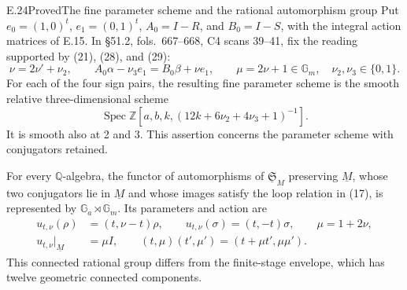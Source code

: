 \begin{statement}{E.24}{Proved}{The fine parameter scheme and the rational automorphism group}
Put \(e_0=(1,0)^t\), \(e_1=(0,1)^t\),
\(A_0=I-R\), and \(B_0=I-S\), with the integral action matrices
of E.15.  In \S51.2, fols.~667--668, C4 scans 39--41, fix
the reading supported by (21), (28), and (29):
\[
 \nu=2\nu'+\nu_2,\qquad
 A_0\alpha-\nu_3e_1=B_0\beta+\nu e_1,
 \qquad \mu=2\nu+1\in\mathbb G_m,
 \quad \nu_2,\nu_3\in\{0,1\}.
                                                        \tag{E.24.1}
\]
For each of the four sign pairs, the resulting fine parameter
scheme is the smooth relative three-dimensional scheme
\[
 \operatorname{Spec}\mathbb Z[a,b,k,
                   (12k+6\nu_2+4\nu_3+1)^{-1}].          \tag{E.24.2}
\]
It is smooth also at 2 and 3.  This assertion concerns the
parameter scheme with conjugators retained.

For every \(\mathbb Q\)-algebra, the functor of automorphisms
of \(\underline{\mathfrak S}_M\) preserving \(\underline M\),
whose two conjugators lie in \(\underline M\) and whose images
satisfy the loop relation in (17), is represented by
\(\mathbb G_a\rtimes\mathbb G_m\).  Its parameters and action are
\[
 \begin{split}
 u_{t,\nu}(\rho)&=(t,\nu-t)\rho,\qquad
 u_{t,\nu}(\sigma)=(t,-t)\sigma,\qquad \mu=1+2\nu,\\
 u_{t,\nu}|_{\underline M}&=\mu I,\qquad
 (t,\mu)(t',\mu')=(t+\mu t',\mu\mu').
 \end{split}                                             \tag{E.24.3}
\]
This connected rational group differs from the finite-stage
envelope, which has twelve geometric connected components.
\end{statement}
